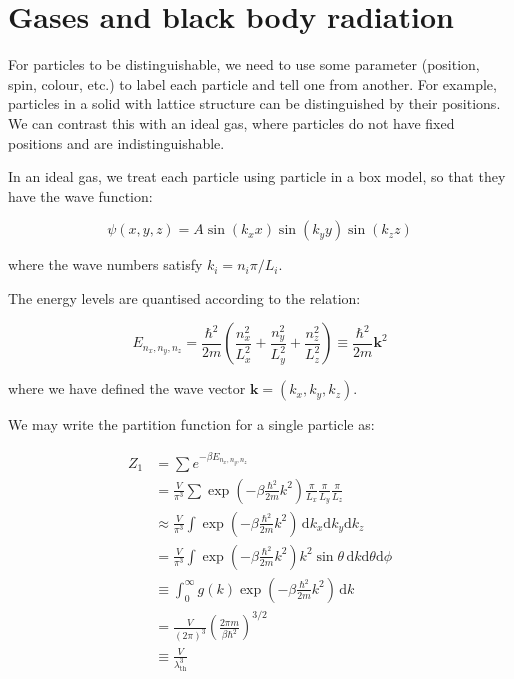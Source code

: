 \documentclass[12pt]{article}
\begin{document}



\pagebreak
\section*{Gases and black body radiation}


For particles to be distinguishable, we need to use some parameter (position, spin, colour, etc.) to label each particle and tell one from another. For example, particles in a solid with lattice structure can be distinguished by their positions. We can contrast this with an ideal gas, where particles do not have fixed positions and are indistinguishable.

In an ideal gas, we treat each particle using particle in a box model, so that they have the wave function:

\begin{equation}
    \psi(x, y, z) = A \sin{(k_{x}x)} \sin{(k_{y}y)} \sin{(k_{z}z)}
\end{equation}

where the wave numbers satisfy $k_{i} = n_{i}\pi/L_{i}$.

The energy levels are quantised according to the relation:

\begin{equation}
    E_{n_{x}, n_{y}, n_{z}} = \frac{\hbar^{2}}{2m} \left( \frac{n_{x}^{2}}{L_{x}^{2}} + \frac{n_{y}^{2}}{L_{y}^{2}} + \frac{n_{z}^{2}}{L_{z}^{2}} \right) \equiv \frac{\hbar^{2}}{2m} \mathbf{k}^{2}
\end{equation}

where we have defined the wave vector $\mathbf{k} = (k_{x}, k_{y}, k_{z})$.

We may write the partition function for a single particle as:

\begin{equation}
    \begin{split}
        Z_{1} &= \sum e^{-\beta E_{n_{x}, n_{y}, n_{z}}} \\
        &= \frac{V}{\pi^{3}} \sum \exp\left( -\beta \frac{\hbar^{2}}{2m} k^{2} \right) \frac{\pi}{L_{x}} \frac{\pi}{L_{y}} \frac{\pi}{L_{z}} \\
        &\approx \frac{V}{\pi^{3}} \int \exp\left( -\beta \frac{\hbar^{2}}{2m} k^{2} \right) \, \mathrm{d}k_{x} \mathrm{d}k_{y} \mathrm{d}k_{z} \\
        &= \frac{V}{\pi^{3}} \int \exp\left( -\beta \frac{\hbar^{2}}{2m} k^{2} \right) k^{2} \sin{\theta} \, \mathrm{d}k \mathrm{d}\theta \mathrm{d}\phi \\
        &\equiv \int_{0}^{\infty} g(k) \exp\left( -\beta \frac{\hbar^{2}}{2m} k^{2} \right) \, \mathrm{d}k \\
        &= \frac{V}{(2\pi)^{3}} \left( \frac{2\pi m}{\beta \hbar^{2}} \right)^{3/2} \\
        &\equiv \frac{V}{\lambda_{\text{th}}^{3}}
    \end{split}
\end{equation}
\end{document}
